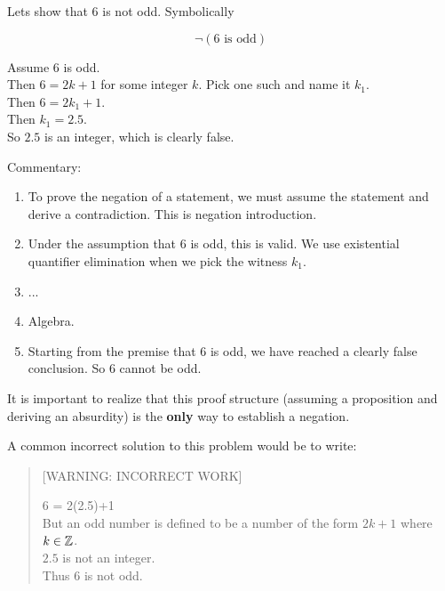 \begin{example}
	
	Lets show that $6$ is not odd.  Symbolically
	
	\[
	\neg( \textrm{$6$ is odd})
	\]
	
	\begin{fitch}
		\textrm{Assume $6$ is odd.}\\
		 \fa \textrm{Then $6 = 2k+1$ for some integer $k$.  Pick one such and name it $k_1$.}\\
		\fa \textrm{Then $6 = 2k_1 + 1$.}\\
		\fa \textrm{Then $k_1 = 2.5$.}\\
		\fa \textrm{So $2.5$ is an integer, which is clearly false.}
		\end{fitch}
	
	Commentary:
	
	\begin{enumerate}
			\item To prove the negation of a statement, we must assume the statement and derive a contradiction.  This is negation introduction.
			\item Under the assumption that $6$ is odd, this is valid. We use existential quantifier elimination when we pick the witness $k_1$.
			\item ...
			\item Algebra.
			\item Starting from the premise that $6$ is odd, we have reached a clearly false conclusion.  So $6$ cannot be odd.
		\end{enumerate}
	
	It is important to realize that this proof structure (assuming a proposition and deriving an absurdity) is the \textbf{only} way to establish a negation.
	
	A common incorrect solution to this problem would be to write:
	
	\begin{quote}[WARNING: INCORRECT WORK]
		
\begin{fitch*}
	6 = 2(2.5)+1\\
	\textrm{But an odd number is defined to be a number of the form  $2k+1$ where $k \in \mathbb{Z}$.}\\
	\textrm{$2.5$ is not  an integer.}\\
	\textrm{Thus $6$ is not odd.}
\end{fitch*}

	\end{quote}


\end{example}
